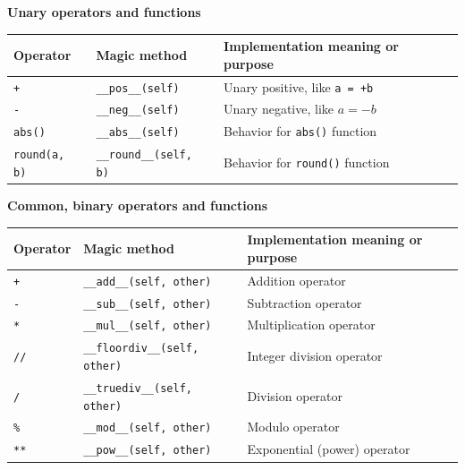 \textbf{Unary operators and functions}\\[0.1cm]
\begin{tabular}{|p{3cm}|p{4cm}|p{8cm}|}
\hline
\textbf{Operator} & \textbf{Magic method} & \textbf{Implementation meaning or purpose} \\
\hline
\texttt{+} & \texttt{\_\_pos\_\_(self)} & Unary positive, like \texttt{a = +b} \\
\texttt{-} & \texttt{\_\_neg\_\_(self)} & Unary negative, like $a = -b$ \\
\texttt{abs()} & \texttt{\_\_abs\_\_(self)} & Behavior for \texttt{abs()} function \\
\texttt{round(a, b)} & \texttt{\_\_round\_\_(self, b)} & Behavior for \texttt{round()} function \\
\hline
\end{tabular}

\vspace{0.5cm}

\textbf{Common, binary operators and functions}\\[0.1cm]
\begin{tabular}{|p{2cm}|p{5cm}|p{8cm}|}
\hline
\textbf{Operator} & \textbf{Magic method} & \textbf{Implementation meaning or purpose} \\
\hline
\texttt{+} & \texttt{\_\_add\_\_(self, other)} & Addition operator \\
\texttt{-} & \texttt{\_\_sub\_\_(self, other)} & Subtraction operator \\
\texttt{*} & \texttt{\_\_mul\_\_(self, other)} & Multiplication operator \\
\texttt{//} & \texttt{\_\_floordiv\_\_(self, other)} & Integer division operator \\
\texttt{/} & \texttt{\_\_truediv\_\_(self, other)} & Division operator \\
\texttt{\%} & \texttt{\_\_mod\_\_(self, other)} & Modulo operator \\
\texttt{**} & \texttt{\_\_pow\_\_(self, other)} & Exponential (power) operator \\
\hline
\end{tabular}

\vspace{0.5cm}

